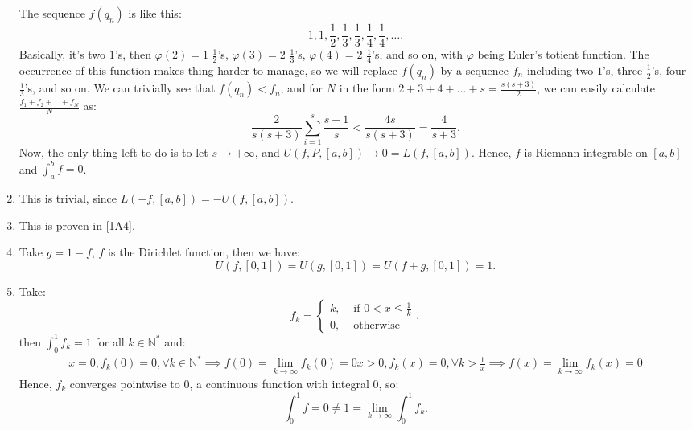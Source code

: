 \begin{enumerate}[label=\textbf{1B.\arabic*}]
    The sequence \( f(q_{n}) \) is like this:
    \[
      1, 1, \frac{1}{2}, \frac{1}{3}, \frac{1}{3}, \frac{1}{4}, \frac{1}{4}, \ldots 
    .\] 
    Basically, it's two \( 1 \)'s, then \( \varphi(2) = 1 \) \( \frac{1}{2} \)'s, \( \varphi(3)
    = 2\) \( \frac{1}{3} \)'s, \( \varphi(4) = 2 \) \( \frac{1}{4} \)'s, and so
    on, with \( \varphi \) being Euler's totient function. The occurrence of
    this function makes thing harder to manage, so we will replace \( f(q_{n})
    \) by a sequence \( f_{n} \) including two \( 1 \)'s, three \( \frac{1}{2}
    \)'s, four \( \frac{1}{3} \)'s, and so on. We can trivially see that \(
    f(q_{n}) < f_{n} \), and for \( N \) in the form \( 2 + 3 + 4 + \ldots  + s
    = \frac{s(s+3)}{2}\), we can easily calculate \( \frac{f_{1} + f_{2} +
    \ldots + f_{N}}{N} \) as:
    \[
      \frac{2}{s(s+3)}\sum_{i = 1}^{s} \frac{s + 1}{s} < \frac{4s}{s(s+3)} =
      \frac{4}{s + 3}
    .\] 
    Now, the only thing left to do is to let \( s \to +\infty \), and \( U(f, P,
    [a, b]) \to 0 = L(f, [a, b]) \). Hence, \( f \) is Riemann integrable on \(
    [a, b]\) and \( \int _{a}^{b} f = 0 \).
  \item This is trivial, since \( L(-f, [a, b]) = -U(f, [a, b]) \).
  \item This is proven in \ref{1A4}.
  \item Take \( g = 1 -f \), \( f \) is the Dirichlet function, then we have:
    \[
      U(f, [0, 1]) = U(g, [0, 1]) = U(f + g, [0, 1]) = 1
    .\]
  \item Take:
    \[
      f_{k} = \begin{cases}
        k, &\text{ if } 0 < x \le \frac{1}{k}\\
        0, & \text{ otherwise}
      \end{cases}
    ,\] then \( \int _{0}^{1} f_{k} = 1 \) for all \( k \in \mathbb{N}^{*} \)
    and:
    \begin{gather*}
      x = 0, f_{k}(0) = 0, \forall k \in \mathbb{N}^{*} \implies f(0) = \lim_{k \to
      \infty} f_{k}(0) = 0
      x > 0, f_{k}(x) = 0, \forall k > \frac{1}{x} \implies f(x) = \lim_{k \to
      \infty} f_{k}(x) = 0
    \end{gather*}
    Hence, \( f_{k} \) converges pointwise to \( 0 \), a continuous function
    with integral \( 0 \), so:
    \[
      \int _{0}^{1} f = 0 \neq 1 = \lim_{k \to \infty} \int _{0}^{1} f_{k}
    .\] 
\end{enumerate}


